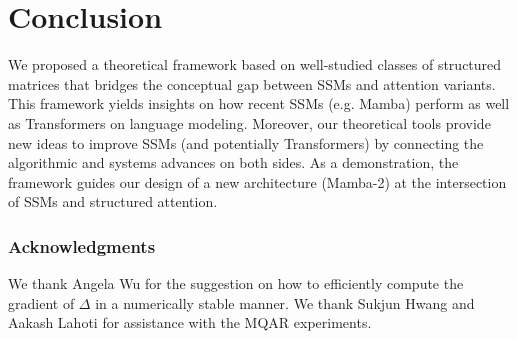 \section{Conclusion}
\label{sec:conclusion}

We proposed a theoretical framework based on well-studied classes of structured matrices that bridges the conceptual gap between SSMs and attention variants. This framework yields insights on how recent SSMs (e.g. Mamba) perform as well as Transformers on language modeling. Moreover, our theoretical tools provide new ideas to improve SSMs (and potentially Transformers) by connecting the algorithmic and systems advances on both sides. As a demonstration, the framework guides our design of a new architecture (Mamba-2) at the intersection of SSMs and structured attention.

\subsubsection*{Acknowledgments}
We thank Angela Wu for the suggestion on how to efficiently compute the gradient of $\Delta$ in a numerically stable manner. We thank Sukjun Hwang and Aakash Lahoti for assistance with the MQAR experiments.

\printbibliography



